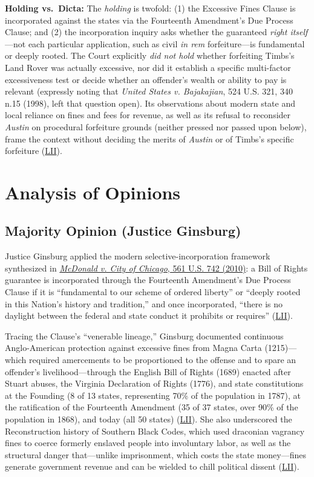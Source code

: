 \documentclass[12pt]{article}
\begin{document}
\textbf{Holding vs.\ Dicta:} The \textit{holding} is twofold: (1) the Excessive Fines Clause is incorporated against the states via the Fourteenth Amendment's Due Process Clause; and (2) the incorporation inquiry asks whether the guaranteed \textit{right itself}---not each particular application, such as civil \textit{in rem} forfeiture---is fundamental or deeply rooted. The Court explicitly \textit{did not hold} whether forfeiting Timbs's Land Rover was actually excessive, nor did it establish a specific multi-factor excessiveness test or decide whether an offender's wealth or ability to pay is relevant (expressly noting that \textit{United States v. Bajakajian}, 524 U.S. 321, 340 n.15 (1998), left that question open). Its observations about modern state and local reliance on fines and fees for revenue, as well as its refusal to reconsider \textit{Austin} on procedural forfeiture grounds (neither pressed nor passed upon below), frame the context without deciding the merits of \textit{Austin} or of Timbs's specific forfeiture (\href{https://www.law.cornell.edu/supremecourt/text/17-1091}{LII}).

\section{Analysis of Opinions}

\subsection{Majority Opinion (Justice Ginsburg)}

Justice Ginsburg applied the modern selective-incorporation framework synthesized in \href{https://supreme.justia.com/cases/federal/us/561/742/}{\textit{McDonald v. City of Chicago}, 561 U.S. 742 (2010)}: a Bill of Rights guarantee is incorporated through the Fourteenth Amendment's Due Process Clause if it is ``fundamental to our scheme of ordered liberty'' or ``deeply rooted in this Nation's history and tradition,'' and once incorporated, ``there is no daylight between the federal and state conduct it prohibits or requires'' (\href{https://www.law.cornell.edu/supremecourt/text/17-1091}{LII}).

Tracing the Clause's ``venerable lineage,'' Ginsburg documented continuous Anglo-American protection against excessive fines from Magna Carta (1215)---which required amercements to be proportioned to the offense and to spare an offender's livelihood---through the English Bill of Rights (1689) enacted after Stuart abuses, the Virginia Declaration of Rights (1776), and state constitutions at the Founding (8 of 13 states, representing 70\% of the population in 1787), at the ratification of the Fourteenth Amendment (35 of 37 states, over 90\% of the population in 1868), and today (all 50 states) (\href{https://www.law.cornell.edu/supremecourt/text/17-1091}{LII}). She also underscored the Reconstruction history of Southern Black Codes, which used draconian vagrancy fines to coerce formerly enslaved people into involuntary labor, as well as the structural danger that---unlike imprisonment, which costs the state money---fines generate government revenue and can be wielded to chill political dissent (\href{https://www.law.cornell.edu/supremecourt/text/17-1091}{LII}).
\end{document}
